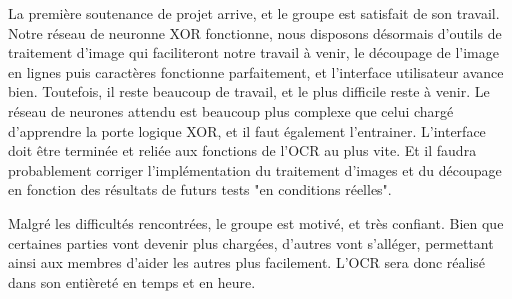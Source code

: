 \documentclass[12pt]{report}
\begin{document}
La première soutenance de projet arrive, et le groupe est satisfait de son travail. Notre réseau de neuronne XOR fonctionne, nous disposons désormais d'outils de traitement d'image qui faciliteront notre travail à venir, le découpage de l'image en lignes puis caractères fonctionne parfaitement, et l'interface utilisateur avance bien. Toutefois, il reste beaucoup de travail, et le plus difficile reste à venir. Le réseau de neurones attendu est beaucoup plus complexe que celui chargé d'apprendre la porte logique XOR, et il faut également l'entrainer. L'interface doit être terminée et reliée aux fonctions de l'OCR au plus vite. Et il faudra probablement corriger l'implémentation du traitement d'images et du découpage en fonction des résultats de futurs tests "en conditions réelles".

Malgré les difficultés rencontrées, le groupe est motivé, et très confiant. Bien que certaines parties vont devenir plus chargées, d'autres vont s'alléger, permettant ainsi aux membres d'aider les autres plus facilement. L'OCR sera donc réalisé dans son entièreté en temps et en heure.

\vfill

\end{document}
